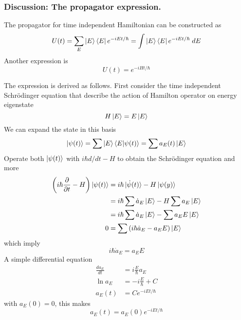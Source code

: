\documentclass[../../../main.tex]{subfiles}
\begin{document}
\subsubsection{Discussion: The propagator expression.}
The propagator for time independent Hamiltonian can be constructed as 
\begin{equation*}
    U(t)=\sum_E \ket{E } \bra{E }e^{-iEt/\hbar}=\int \ket{E} \bra{E}e^{-iEt/\hbar}\;dE
\end{equation*}
Another expression is 
\begin{equation*}
    U(t)=e^{-iHt/\hbar}
\end{equation*}

The expression is derived as follows.
First consider the time independent Schrödinger equation that describe the action of Hamilton operator on energy eigenstate
\begin{equation*}
    H \ket{E}=E \ket{E}
\end{equation*}
We can expand the state in this basis 
\begin{equation*}
    \ket{\psi(t)}=\sum \ket{E }\braket{E|\psi(t)}=\sum a_E(t)\ket{E}
\end{equation*}
Operate both $\ket{\psi(t)}$ with $i \hbar d/dt-H$ to obtain the Schrödinger equation and more
\begin{align*}
    \left( i \hbar \frac{\partial }{\partial t }-H  \right) \ket{\psi(t)}&= i \hbar \ket{\dot{\psi}(t)}-H \ket{\psi(y)}\\
    &= i \hbar \sum \dot{a}_E \ket{E }- H\sum a_E \ket{E }\\
    &= i \hbar \sum \dot{a}_E \ket{E }- \sum a_E E\ket{E }\\
    0&= \sum \left( i \hbar \dot{a }_E-a_EE  \right) \ket{E}
\end{align*}
which imply
\begin{equation*}
   i \hbar \dot{a }_E=a_EE 
\end{equation*}
A simple differential equation
\begin{align*}
    \frac{d a_E }{dt }&= i \frac{E }{\hbar }a_E\\
    \ln a_E &= -i \frac{E }{\hbar }+C\\
    a_E(t)&= C e^{-i E t/\hbar}
\end{align*}
with $a_E(0)=0$, this makes 
\begin{equation*}
    a_E(t)= a_E(0)e^{-i E t/\hbar}
\end{equation*}
\end{document}
